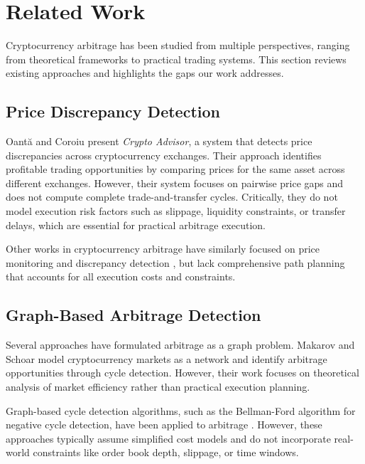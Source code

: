 \documentclass[11pt]{article}
\begin{document}
\section{Related Work}

Cryptocurrency arbitrage has been studied from multiple perspectives, ranging from theoretical frameworks to practical trading systems. This section reviews existing approaches and highlights the gaps our work addresses.

\subsection{Price Discrepancy Detection}

Oantă and Coroiu \cite{oanta2023arbitrage} present \emph{Crypto Advisor}, a system that detects price discrepancies across cryptocurrency exchanges. Their approach identifies profitable trading opportunities by comparing prices for the same asset across different exchanges. However, their system focuses on pairwise price gaps and does not compute complete trade-and-transfer cycles. Critically, they do not model execution risk factors such as slippage, liquidity constraints, or transfer delays, which are essential for practical arbitrage execution.

Other works in cryptocurrency arbitrage have similarly focused on price monitoring and discrepancy detection \cite{chen2019cryptocurrency, makarov2019trading}, but lack comprehensive path planning that accounts for all execution costs and constraints.

\subsection{Graph-Based Arbitrage Detection}

Several approaches have formulated arbitrage as a graph problem. Makarov and Schoar \cite{makarov2019trading} model cryptocurrency markets as a network and identify arbitrage opportunities through cycle detection. However, their work focuses on theoretical analysis of market efficiency rather than practical execution planning.

Graph-based cycle detection algorithms, such as the Bellman-Ford algorithm for negative cycle detection, have been applied to arbitrage \cite{chen2019cryptocurrency}. However, these approaches typically assume simplified cost models and do not incorporate real-world constraints like order book depth, slippage, or time windows.
\end{document}
